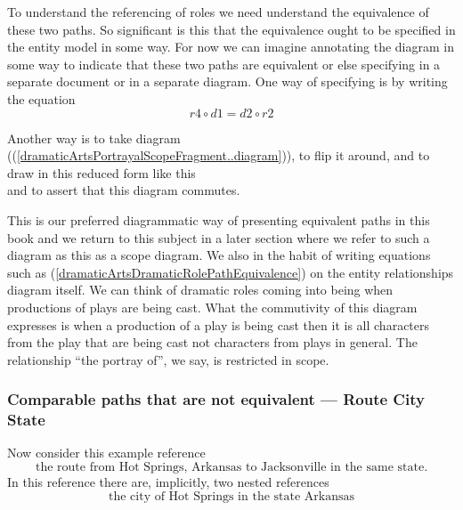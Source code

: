 To understand the referencing of roles we need understand the equivalence of these two paths. 
So significant is this that the equivalence ought to be specified in the entity model in some way.
For now we can imagine annotating the diagram in some way to indicate that these two paths are equivalent 
or else specifying in a separate document or in a separate diagram. 
One way of specifying is by writing the equation
\begin{equation}
\label{dramaticArtsDramaticRolePathEquivalence}
r4 \circ d1 = d2 \circ r2
\end{equation}

Another way is to take diagram ((\ref{dramaticArtsPortrayalScopeFragment..diagram})), 
to flip it  around, and to draw  in this reduced form like this
\begin{equation}
\label{dramaticArtsPortrayalScopeAppearance1}

\end{equation}
and to assert that this diagram commutes.

This is our preferred diagrammatic way of presenting equivalent paths in this book and we return to this subject in a later section where we refer to such a diagram as this as a scope diagram. 
We also in the habit of writing equations such as (\ref{dramaticArtsDramaticRolePathEquivalence}) on the entity relationships diagram itself.
We can think of dramatic roles coming into being when productions of plays are being cast. What the commutivity of this diagram expresses is when a production of a play is being cast then it is all characters from the play that are being cast not characters from plays in general. 
The relationship ``the portray of'', we say, is restricted in scope.

\subsubsection {Comparable paths that are not equivalent --- Route City State}
\mynote {}
Now consider this example reference
\begin{equation}
\mbox{the route from Hot Springs, Arkansas to Jacksonville in the same state.}
\end{equation}
In this reference there are, implicitly, two nested references
\begin{equation}
\mbox{the city of Hot Springs in the state  Arkansas}
\end{equation}

